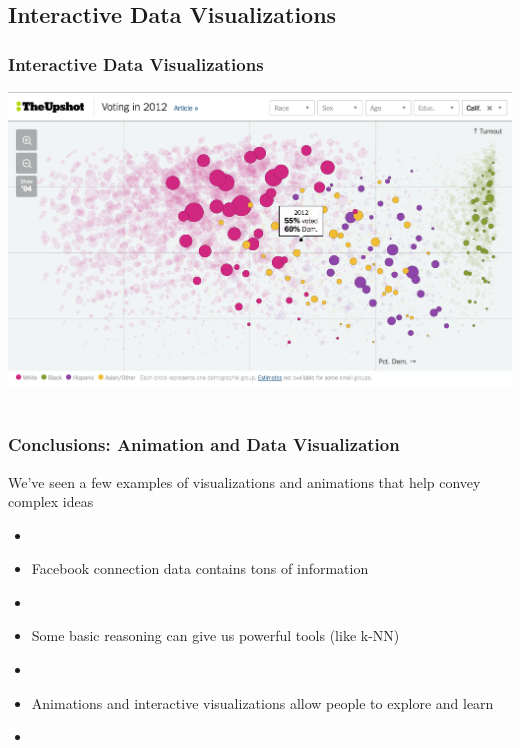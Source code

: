 \documentclass{beamer} %
\newcommand{\1}{\mathbb{1}}
\begin{document}
\subsection{Interactive Data Visualizations}
\begin{frame}[t]\frametitle{Interactive Data Visualizations}
\includegraphics[scale = 0.33]{./visualization/voting_habits_viz.png}\\
\href{http://www.nytimes.com/interactive/2016/06/10/upshot/voting-habits-turnout-partisanship.html}
{}\\	
\end{frame}














\begin{frame}[t]\frametitle{Conclusions: Animation and Data Visualization}
{\large{We've seen a few examples of visualizations and animations that help convey complex ideas}}
\begin{itemize}
	\item[]
	\item Facebook connection data contains tons of information
	\item[]
\pause
	\item Some basic reasoning can give us powerful tools (like k-NN)
	\item[]
\pause
	\item Animations and interactive visualizations allow people to explore and learn
	\item[]
\end{itemize}
\pause
\end{frame}
\end{document}
